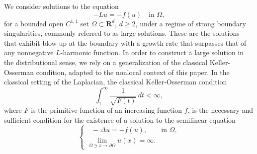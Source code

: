 \documentclass[a4paper,12pt,draft]{article}
\theoremstyle{plain}
\theoremstyle{definition}
\numberwithin{equation}{section}
\renewcommand{\geq}{\geqslant}
\newcommand{\1}{1}
\begin{document}
We consider solutions to the equation
\begin{equation}\label{e:semilinear}
-Lu = - f(u) \quad \text{in } \Omega,
\end{equation}
for a bounded open \( C^{1,1} \) set \( \Omega \subset \mathbf{R}^d \), \( d \geq 2 \), under a regime of strong boundary singularities, commonly referred to as large solutions. These are the solutions that exhibit blow-up at the boundary with a growth rate that surpasses that of any nonnegative $L$-harmonic function. In order to construct a large solution in the distributional sense, we rely on a generalization of the classical Keller-Osserman condition, adapted to the nonlocal context of this paper. In the classical setting of the Laplacian, the classical Keller-Osserman condition 
\begin{equation}\label{eq:KO_classical}
    \int_1^\infty \frac 1{\sqrt{F(t)}}\, dt<\infty,
\end{equation}
where $F$ is the primitive function of an increasing function $f$, is the necessary and sufficient condition for the existence of a solution to the semilinear equation
\begin{equation}\label{eq:local}
    \begin{cases}
   \ \ \  -\Delta u = -f(u), &\text{in }\Omega,\\
    \lim\limits_{\Omega\ni x\to\partial\Omega} u(x)=\infty.&   
    \end{cases}
\end{equation}
\end{document}
